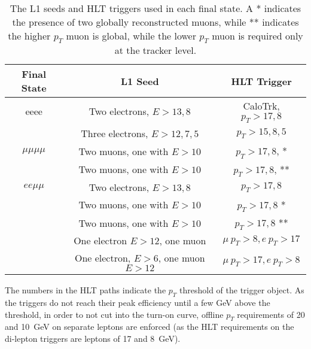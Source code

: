 \begin{table}[h]
\centering
\begin{tabular}{|c|c|c|}
\hline
Final State & L1 Seed & HLT Trigger \\
\hline
eeee & Two electrons, $E>13,8$ & CaloTrk, $p_T > 17, 8$  \\ %
     & Three electrons, $E>12, 7, 5$ & $p_T > 15, 8, 5$  \\ %
\hline
$\mu\mu\mu\mu$ & Two muons, one with $E>10$ & $p_T > 17, 8$, * \\ %
               & Two muons, one with $E>10$ & $p_T > 17, 8$, ** \\ %
\hline
$ee\mu\mu$ & Two electrons, $E>13, 8$& $p_T > 17, 8$ \\ %
            & Two muons, one with $E>10$ & $p_T > 17, 8$ * \\ %
            & Two muons, one with $E>10$ & $p_T > 17, 8$ ** \\ %
            & One electron $E>12$, one muon & $\mu~p_T > 8, e~p_T > 17$ \\ %
            & One electron, $E>6$, one muon $E>12$ & $\mu~p_T > 17, e~p_T > 8$ \\ %
\hline
\end{tabular}
\caption[The L1 seeds and HLT triggers used in each final state.]{The L1 seeds
and HLT triggers used in each final state. A * indicates the presence of two
globally reconstructed muons, while ** indicates the higher $p_T$ muon is
global, while the lower $p_T$ muon is required only at the tracker level.}
\label{tab:triggers}
\end{table}

The numbers in the HLT paths indicate the $p_T$ threshold of the trigger object.
As the triggers do not reach their peak efficiency until a few GeV above the
threshold, in order to not cut into the turn-on curve, offline $p_T$
requirements of 20 and 10~GeV on separate leptons are enforced (as the HLT
requirements on the di-lepton triggers are leptons of 17 and 8~GeV).

